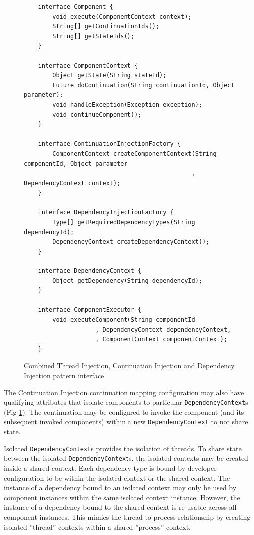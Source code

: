 \documentclass[prodmode]{style/acmlarge}
\begin{document}
\begin{figure}[tp]
\centering
\begin{verbatim}
    interface Component {
        void execute(ComponentContext context);
        String[] getContinuationIds();
        String[] getStateIds();
    }

    interface ComponentContext {
        Object getState(String stateId);
        Future doContinuation(String continuationId, Object parameter);
        void handleException(Exception exception);
        void continueComponent();
    }
    
    interface ContinuationInjectionFactory {
        ComponentContext createComponentContext(String componentId, Object parameter
                                               , DependencyContext context);
    }
    
    interface DependencyInjectionFactory {
        Type[] getRequiredDependencyTypes(String dependencyId);
        DependencyContext createDependencyContext();
    }
    
    interface DependencyContext {
        Object getDependency(String dependencyId);
    }

    interface ComponentExecutor {
        void executeComponent(String componentId 
                    , DependencyContext dependencyContext,
                    , ComponentContext componentContext);
    }
\end{verbatim}
\caption{Combined Thread Injection, Continuation Injection and Dependency Injection pattern interface\footnotemark}
\label{fig:IocInjectionInterfaces}
\end{figure}


The Continuation Injection continuation mapping configuration may also have
qualifying attributes that isolate components to particular
\texttt{DependencyContext}s (Fig \ref{fig:IocInjectionInterfaces}).  The
continuation may be configured to invoke the component (and its subsequent
invoked components) within a new \texttt{DependencyContext} to not share state.

Isolated \texttt{DependencyContext}s provides the isolation of threads.  To
share state between the isolated \texttt{Depend\-ency\-Context}s, the isolated
contexts may be created inside a shared context.  Each dependency type is bound
by developer configuration to be within the isolated context or the shared
context.  The instance of a dependency bound to an isolated context may only be
used by component instances within the same isolated context instance.  However,
the instance of a dependency bound to the shared context is re-usable across all
component instances.  This mimics the thread to process relationship by creating
isolated ''thread'' contexts within a shared ''process'' context.
\end{document}
